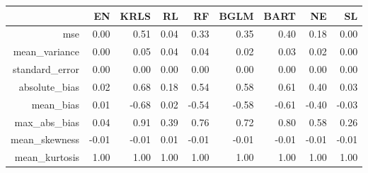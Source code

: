 \begin{table}[ht]
\centering
\begin{tabular}{rrrrrrrrr}
  \hline
 & EN & KRLS & RL & RF & BGLM & BART & NE & SL \\ 
  \hline
mse & 0.00 & 0.51 & 0.04 & 0.33 & 0.35 & 0.40 & 0.18 & 0.00 \\ 
  mean\_variance & 0.00 & 0.05 & 0.04 & 0.04 & 0.02 & 0.03 & 0.02 & 0.00 \\ 
  standard\_error & 0.00 & 0.00 & 0.00 & 0.00 & 0.00 & 0.00 & 0.00 & 0.00 \\ 
  absolute\_bias & 0.02 & 0.68 & 0.18 & 0.54 & 0.58 & 0.61 & 0.40 & 0.03 \\ 
  mean\_bias & 0.01 & -0.68 & 0.02 & -0.54 & -0.58 & -0.61 & -0.40 & -0.03 \\ 
  max\_abs\_bias & 0.04 & 0.91 & 0.39 & 0.76 & 0.72 & 0.80 & 0.58 & 0.26 \\ 
  mean\_skewness & -0.01 & -0.01 & 0.01 & -0.01 & -0.01 & -0.01 & -0.01 & -0.01 \\ 
  mean\_kurtosis & 1.00 & 1.00 & 1.00 & 1.00 & 1.00 & 1.00 & 1.00 & 1.00 \\ 
   \hline
\end{tabular}
\end{table}
